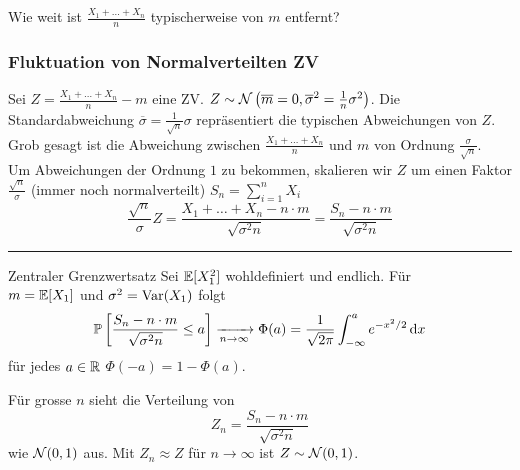 \begin{center}
	Wie weit ist $\frac{X_1 + \ldots + X_n}{n}$ typischerweise von $m$ entfernt?
\end{center}

\subsubsection{Fluktuation von Normalverteilten ZV}%
\label{ssub:fluktuation_von_normalverteilten_zv}
 
Sei $Z = \frac{X_1 + \ldots + X_n}{n} -m$ eine ZV. $Z \sim \mathcal{N} \left( \overline{m} = 0, \overline{\sigma}^2 =
\frac{1}{n} \sigma^2 \right)$. Die Standardabweichung $\overline{\sigma} =
\frac{1}{\sqrt{n}} \sigma$ repräsentiert die typischen Abweichungen von $Z$.\\
Grob gesagt ist die Abweichung zwischen $\frac{X_1 + \ldots + X_n}{n}$ und $m$ von Ordnung $\frac{\sigma}{\sqrt{n}}$.\\
Um Abweichungen der Ordnung $1$ zu bekommen, skalieren wir $Z$ um einen Faktor $\frac{\sqrt{n}}{\sigma}$ (immer noch
normalverteilt) $S_n = \sum_{i=1}^{n} X_i$
\begin{equation*}
	\frac{\sqrt{n}}{\sigma} Z = \frac{X_1 + \ldots + X_n - n \cdot m}{\sqrt{\sigma^2 n}} = \frac{S_n - n \cdot
	m}{\sqrt{\sigma^2 n}} 
\end{equation*}
\hrule

\begin{definition}{Zentraler Grenzwertsatz}
	Sei $\mathbb{E} [X_1^2]$ wohldefiniert und endlich. Für \\$m = \mathbb{E} [X_1]$ und $\sigma^2 = \operatorname{Var} (X_1)$ folgt
	\begin{equation*}
		\pr \left[ \frac{S_n - n \cdot m}{\sqrt{\sigma^2 n}} \leq a \right] \xrightarrow[n \rightarrow \infty]{} \Phi (a) =
		\frac{1}{\sqrt{2 \pi}} \int_{- \infty}^{a} e^{-x^2/2} \dif x 
	\end{equation*}
	für jedes $a \in \mathbb{R}$ $\Phi (-a) = 1- \Phi(a)$.
\end{definition}
\begin{tcolorbox}[lemmacore]
	Für grosse $n$ sieht die Verteilung von 
	\begin{equation*}
		Z_n = \frac{S_n - n \cdot m}{\sqrt{\sigma^2 n}}
	\end{equation*}
	wie $\mathcal{N} (0,1)$ aus. Mit $Z_n \approx Z$ für $n \rightarrow \infty$ ist $Z \sim \mathcal{N} (0,1)$.
\end{tcolorbox}

